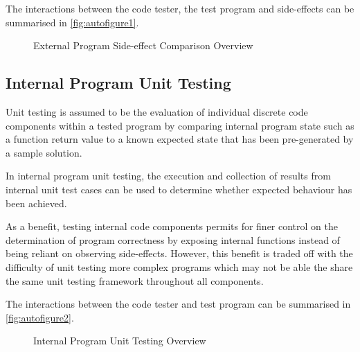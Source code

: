 \documentclass[hidelinks]{report}
\begin{document}
The interactions between the code tester, the test program and side-effects can be summarised in \autoref{fig:autofigure1}.

\begin{figure}[h]
	\centering
	\caption{External Program Side-effect Comparison Overview}
	\label{fig:autofigure1}
\end{figure}


\subsection{Internal Program Unit Testing}

Unit testing is assumed to be the evaluation of individual discrete code components within a tested program by comparing internal program state such as a function return value to a known expected state that has been pre-generated by a sample solution.

In internal program unit testing, the execution and collection of results from internal unit test cases can be used to determine whether expected behaviour has been achieved.

As a benefit, testing internal code components permits for finer control on the determination of program correctness by exposing internal functions instead of being reliant on observing side-effects. However, this benefit is traded off with the difficulty of unit testing more complex programs which may not be able the share the same unit testing framework throughout all components.

The interactions between the code tester and test program can be summarised in \autoref{fig:autofigure2}.

\begin{figure}[h]
	\centering
	\caption{Internal Program Unit Testing Overview}
	\label{fig:autofigure2}
\end{figure}
\end{document}
